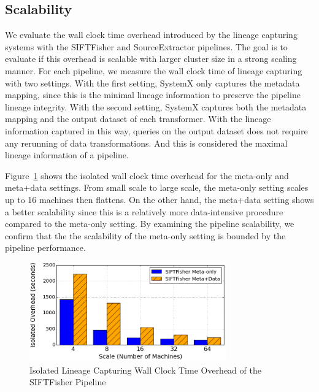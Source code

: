 \documentclass{sig-alternate}
\begin{document}
\subsection{Scalability}
We evaluate the wall clock time overhead introduced by the lineage capturing systems with 
the SIFTFisher and SourceExtractor pipelines. 
The goal is to evaluate if this overhead is scalable with larger cluster size in a strong scaling manner.
For each pipeline, we measure the wall clock time of lineage capturing with two settings.
With the first setting, SystemX only captures the metadata mapping, since this is the minimal lineage information 
to preserve the pipeline lineage integrity.
With the second setting, SystemX captures both the metadata mapping and the output dataset of each transformer.
With the lineage information captured in this way, queries on the output dataset does not require any rerunning of data transformations.
And this is considered the maximal lineage information of a pipeline. 

Figure~\ref{fig:VOC-overhead} shows the isolated wall clock time overhead for the meta-only and meta+data
settings. From small scale to large scale, the meta-only setting scales up to 16 machines then flattens. 
On the other hand, the meta+data setting shows a better scalability since this is a relatively more
data-intensive procedure compared to the meta-only setting. 
By examining the pipeline scalability, we confirm that the the scalability of the meta-only setting is bounded
by the pipeline performance.
\begin{figure}[t]
\begin{center}
    \includegraphics[width=85mm]{pictures/Overhead-Time-VOC}
\caption {Isolated Lineage Capturing Wall Clock Time Overhead of the SIFTFisher Pipeline
    \label{fig:VOC-overhead}
}
\end{center}
\end{figure}
\end{document}
